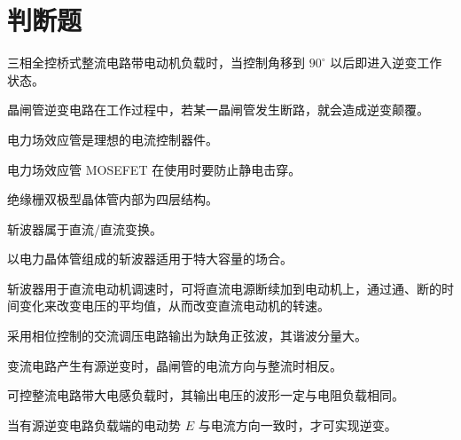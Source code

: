 \documentclass[电力电子]{subfiles}
\begin{document}
	\section{判断题}
	\begin{ti}
		三相全控桥式整流电路带电动机负载时，当控制角移到 $90^\circ$ 以后即进入逆变工作状态。\dui
	\end{ti}

	\begin{ti}
		晶闸管逆变电路在工作过程中，若某一晶闸管发生断路，就会造成逆变颠覆。\dui
	\end{ti}

	\begin{ti}
		电力场效应管是理想的电流控制器件。\cuo
	\end{ti}

	\begin{ti}
		电力场效应管 MOSEFET 在使用时要防止静电击穿。\dui
	\end{ti}

	\begin{ti}
		绝缘栅双极型晶体管内部为四层结构。\dui
	\end{ti}

	\begin{ti}
		斩波器属于直流/直流变换。\dui
	\end{ti}

	\begin{ti}
		以电力晶体管组成的斩波器适用于特大容量的场合。\cuo
	\end{ti}

	\begin{ti}
		斩波器用于直流电动机调速时，可将直流电源断续加到电动机上，通过通、断的时间变化来改变电压的平均值，从而改变直流电动机的转速。\dui
	\end{ti}

	\begin{ti}
		采用相位控制的交流调压电路输出为缺角正弦波，其谐波分量大。\dui
	\end{ti}

	\begin{ti}
		变流电路产生有源逆变时，晶闸管的电流方向与整流时相反。\cuo
	\end{ti}

	\begin{ti}
		可控整流电路带大电感负载时，其输出电压的波形一定与电阻负载相同。\cuo
	\end{ti}

	\begin{ti}
		当有源逆变电路负载端的电动势 $E$ 与电流方向一致时，才可实现逆变。\dui
	\end{ti}
\end{document}

